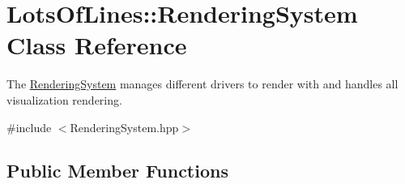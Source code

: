 \hypertarget{class_lots_of_lines_1_1_rendering_system}{}\section{Lots\+Of\+Lines\+:\+:Rendering\+System Class Reference}
\label{class_lots_of_lines_1_1_rendering_system}


The \hyperlink{class_lots_of_lines_1_1_rendering_system}{Rendering\+System} manages different drivers to render with and handles all visualization rendering.  




{\ttfamily \#include $<$Rendering\+System.\+hpp$>$}

\subsection*{Public Member Functions}
